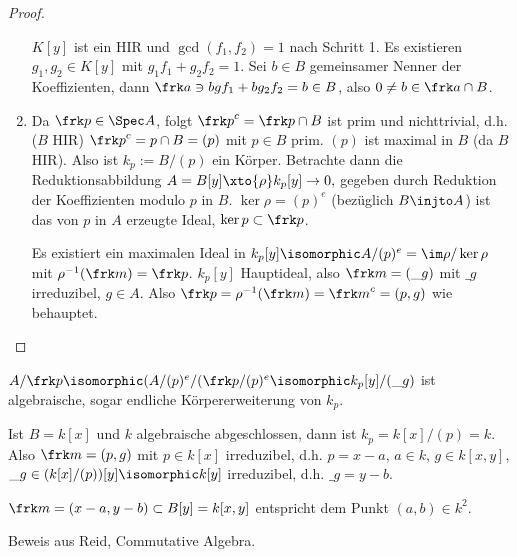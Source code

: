 \begin{ex}
\begin{proof}
\begin{enumerate}[1.]
                $K[y]$ ist ein HIR und $\gcd(f_1, f_2) = 1$ nach Schritt 1.
                Es existieren $g_1, g_2 \in K[y]$ mit $g_1 f_1 + g_2 f_2 = 1$.
                Sei $b \in B$ gemeinsamer Nenner der Koeffizienten, dann $\frk a \ni bgf_1 + bg_2f_2 = b \in B$, also $0 \neq b \in \frk a \cap B$.
            \item
                Da $\frk p \in \Spec A$, folgt ${\frk p}^c = \frk p \cap B$ ist prim und nichttrivial, d.h. ($B$ HIR) ${\frk p}^c = p \cap B = (p)$ mit $p \in B$ prim. 
                $(p)$ ist maximal in $B$ (da $B$ HIR).
                Also ist $k_p := B / (p)$ ein Körper.
                Betrachte dann die Reduktionsabbildung
                \begin{math}
                    A = B[y] \xto{\rho} k_p[y] \to 0,
                \end{math}
                gegeben durch Reduktion der Koeffizienten modulo $p$ in $B$.
                $\ker \rho = (p)^e$ (bezüglich $B \injto A$) ist das von $p$ in $A$ erzeugte Ideal, $\ker p \subset \frk p$.

                Es existiert ein maximalen Ideal in $k_p[y] \isomorphic A / (p)^e = \im \rho / \ker \rho$ mit $\rho^{-1}(\frk m) = \frk p$.
                $k_p[y]$ Hauptideal, also $\frk m = (\_g)$ mit $\_g$ irreduzibel, $g \in A$.
                Also
                \begin{math}
                    \frk p = \rho^{-1}(\frk m) = {\frk m}^c = (p,g)
                \end{math}
                wie behauptet.
        \end{enumerate}
    \end{proof}
    \begin{note}
        \begin{math}
            A / \frk p
            \isomorphic (A / (p)^e / (\frk p / (p)^e
            \isomorphic k_p[y] / (\_g)
        \end{math}
        ist algebraische, sogar endliche Körpererweiterung von $k_p$.

        Ist $B =k[x]$ und $k$ algebraische abgeschlossen, dann ist $k_p = k[x] /(p) = k$.
        Also $\frk m = (p, g)$ mit $p \in k[x]$ irreduzibel, d.h. $p = x - a$, $a \in k$, $g \in k[x,y]$, $\_g \in (k[x]/(p))[y] \isomorphic k[y]$ irreduzibel, d.h. $\_g = y - b$.

        $\frk m = (x-a, y-b) \subset B[y] = k[x,y]$ entspricht dem Punkt $(a,b) \in k^2$.

        Beweis aus Reid, Commutative Algebra.
    \end{note}
\end{ex}
